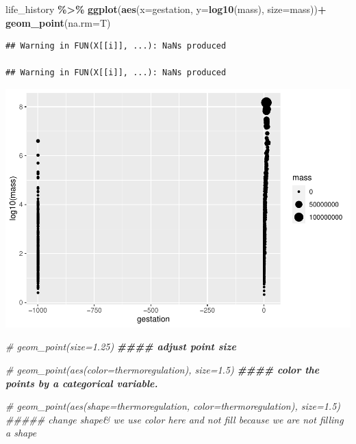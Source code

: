 \documentclass[
]{article}
\newenvironment{Shaded}{\begin{snugshade}}{\end{snugshade}}
\newcommand{\AttributeTok}[1]{\textcolor[rgb]{0.13,0.29,0.53}{#1}}
\newcommand{\CommentTok}[1]{\textcolor[rgb]{0.56,0.35,0.01}{\textit{#1}}}
\newcommand{\DocumentationTok}[1]{\textcolor[rgb]{0.56,0.35,0.01}{\textbf{\textit{#1}}}}
\newcommand{\FunctionTok}[1]{\textcolor[rgb]{0.13,0.29,0.53}{\textbf{#1}}}
\newcommand{\NormalTok}[1]{#1}
\newcommand{\SpecialCharTok}[1]{\textcolor[rgb]{0.81,0.36,0.00}{\textbf{#1}}}
\begin{document}
\begin{Shaded}
\begin{Highlighting}[]
\NormalTok{life\_history }\SpecialCharTok{\%\textgreater{}\%} 
  \FunctionTok{ggplot}\NormalTok{(}\FunctionTok{aes}\NormalTok{(}\AttributeTok{x=}\NormalTok{gestation, }\AttributeTok{y=}\FunctionTok{log10}\NormalTok{(mass), }\AttributeTok{size=}\NormalTok{mass))}\SpecialCharTok{+}
  \FunctionTok{geom\_point}\NormalTok{(}\AttributeTok{na.rm=}\NormalTok{T)}
\end{Highlighting}
\end{Shaded}

\begin{verbatim}
## Warning in FUN(X[[i]], ...): NaNs produced

## Warning in FUN(X[[i]], ...): NaNs produced
\end{verbatim}

\includegraphics{Untitled_files/figure-latex/unnamed-chunk-28-1.pdf}

\begin{Shaded}
\begin{Highlighting}[]
\CommentTok{\# geom\_point(size=1.25)}
\DocumentationTok{\#\#\#\# adjust point size}


\CommentTok{\# geom\_point(aes(color=thermoregulation), size=1.5) }
\DocumentationTok{\#\#\#\# color the points by a categorical variable.}


\CommentTok{\# geom\_point(aes(shape=thermoregulation, color=thermoregulation), size=1.5) \#\#\#\#\# change shape\& we use color here and not fill because we are not filling a shape}
\end{Highlighting}
\end{Shaded}
\end{document}

